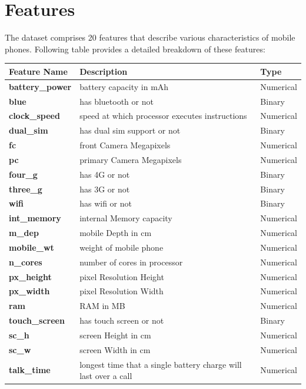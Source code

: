 \documentclass[12pt]{report}
\begin{document}
\section{Features}
The dataset comprises 20 features that describe various characteristics of mobile phones. Following table provides a detailed breakdown of these features:
\begin{table}[H]
	\begin{tabular}{lll}
		\toprule
		\textbf{Feature Name}   & \textbf{Description}  & \textbf{Type}                \\
		\toprule
		\textbf{battery\_power} & battery capacity in mAh   & Numerical               \\
		\midrule
		\textbf{blue}           & has bluetooth or not    & Binary            \\
		\midrule
		\textbf{clock\_speed}   & speed at which processor executes instructions & Numerical \\
		\midrule
		\textbf{dual\_sim}      & has dual sim support or not & Binary \\
		\midrule
		\textbf{fc}             & front Camera Megapixels & Numerical \\
		\midrule
		\textbf{pc}             & primary Camera Megapixels & Numerical \\
		\midrule
		\textbf{four\_g}        & has 4G or not & Binary \\
		\midrule
		\textbf{three\_g}       & has 3G or not & Binary \\
		\midrule
		\textbf{wifi}           & has wifi or not & Binary \\
		\midrule
		\textbf{int\_memory}    & internal Memory capacity & Numerical \\
		\midrule
		\textbf{m\_dep}         & mobile Depth in cm & Numerical \\
		\midrule
		\textbf{mobile\_wt}     & weight of mobile phone & Numerical \\
		\midrule
		\textbf{n\_cores}       & number of cores in processor & Numerical \\
		\midrule
		\textbf{px\_height}     & pixel Resolution Height & Numerical \\
		\midrule
		\textbf{px\_width}      & pixel Resolution Width & Numerical \\
		\midrule
		\textbf{ram}            & RAM in MB & Numerical \\
		\midrule
		\textbf{touch\_screen}  & has touch screen or not & Binary \\
		\midrule
		\textbf{sc\_h}          & screen Height in cm & Numerical \\
		\midrule
		\textbf{sc\_w}          & screen Width in cm & Numerical \\
		\midrule
		\textbf{talk\_time}     & longest time that a single battery charge will last over a call & Numerical \\
		\bottomrule
	\end{tabular}
\end{table}
\end{document}

